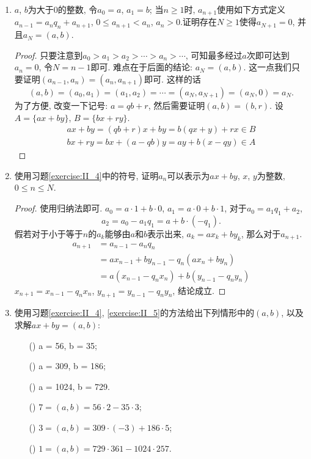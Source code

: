 \documentclass[12pt,a4paper]{book} %
\newcommand{\rmnum}[1]{\romannumeral #1}
\theoremstyle{remark}
\theoremstyle{example}
\theoremstyle{lemma}
\theoremstyle{corollary}
\numberwithin{theorem}{chapter}
\begin{document}
\begin{enumerate}
\item \label{exercise:II_4} $a$, $b$为大于0的整数, 令$a_0 = a$, $a_1 = b$; 当$n \ge 1$时, $a_{n+1}$使用如下方式定义$a_{n-1} = a_nq_n + a_{n+1}$, $0 \le a_{n+1} < a_n$, $a_n > 0$.证明存在$N \ge 1$使得$a_{N + 1} = 0$, 并且$a_N = (a, b)$.
\begin{proof}
只要注意到$a_0 > a_1 > a_2 > \cdots > a_n > \cdots$, 可知最多经过$a$次即可达到$a_n = 0$, 令$N = n-1$即可. 难点在于后面的结论: $a_N = (a, b)$. 这一点我们只要证明$(a_{n-1}, a_n) = (a_n, a_{n+1})$即可. 这样的话
\[
(a, b) = (a_0, a_1) = (a_1, a_2) = \cdots = (a_N, a_{N+1}) = (a_N, 0) = a_N.
\]
为了方便, 改变一下记号: $a =qb + r$, 然后需要证明$(a, b) = (b, r)$. 设$A = \{ax + by\}$, $B = \{bx + ry\}$.
\begin{gather*}
ax + by = (qb + r)x + by = b(qx + y) + rx \in B \\
bx + ry = bx + (a - qb)y = ay + b(x - qy) \in A
\end{gather*}
\end{proof}

\item \label{exercise:II_5} 使用习题\ref{exercise:II_4}中的符号, 证明$a_n$可以表示为$ax + by$, $x$, $y$为整数, $0 \le n \le N$.
\begin{proof}
使用归纳法即可. $a_0 = a \cdot 1 + b \cdot 0$, $a_1 = a \cdot 0 + b \cdot 1$, 对于$a_0 = a_1q_1 + a_2$, 
\[
a_2 = a_0 - a_1q_1 = a + b\cdot(-q_1).
\]
假若对于小于等于$n$的$a_k$能够由$a$和$b$表示出来, $a_k = ax_k + by_k$, 那么对于$a_{n+1}$.
\[
\begin{aligned}
a_{n+1} &= a_{n-1} - a_nq_n \\
&= ax_{n-1} + by_{n-1} - q_n(ax_n + by_n) \\
&= a(x_{n-1} - q_nx_n) + b(y_{n-1} - q_ny_n)
\end{aligned}
\]
$x_{n+1} = x_{n-1} - q_nx_n$, $y_{n+1} = y_{n-1} - q_ny_n$, 结论成立.
\end{proof}

\item \label{exercise:II_6} 使用习题\ref{exercise:II_4}, \ref{exercise:II_5}的方法给出下列情形中的$(a, b)$, 以及求解$ax + by = (a, b)$:
\begin{enumerate}
\item[(\rmnum{1})] a = 56, b = 35;
\item[(\rmnum{2})] a = 309, b = 186;
\item[(\rmnum{3})] a = 1024, b = 729.
\end{enumerate}

\begin{enumerate}
\item[(\rmnum{1})] $7 = (a, b) = 56 \cdot 2 - 35 \cdot 3$;
\item[(\rmnum{2})] $3 = (a, b) = 309 \cdot (-3) + 186 \cdot 5$;
\item[(\rmnum{3})] $1 = (a, b) = 729 \cdot 361 - 1024 \cdot 257$.
\end{enumerate}


\end{enumerate}
\end{document}

